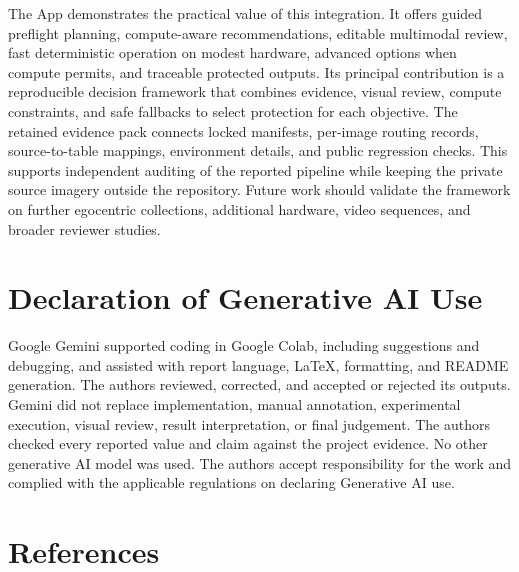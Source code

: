 \documentclass[10pt,twocolumn]{IEEEtran}
\begin{document}
\begin{strip}
\begin{minipage}[t]{0.485\textwidth}
The App demonstrates the practical value of this integration. It offers guided
preflight planning, compute-aware recommendations, editable multimodal review,
fast deterministic operation on modest hardware, advanced options when compute
permits, and traceable protected outputs. Its principal contribution is a
reproducible decision framework that combines evidence, visual review, compute
constraints, and safe fallbacks to select protection for each objective.
The retained evidence pack connects locked manifests, per-image routing records,
source-to-table mappings, environment details, and public regression checks.
This supports independent auditing of the reported pipeline while keeping the
private source imagery outside the repository.
Future work should validate the framework on further egocentric collections,
additional hardware, video sequences, and broader reviewer studies.

\section*{Declaration of Generative AI Use}

Google Gemini supported coding in Google Colab, including suggestions and
debugging, and assisted with report language, LaTeX, formatting, and README
generation. The authors reviewed, corrected, and accepted or rejected its
outputs. Gemini did not replace implementation, manual annotation, experimental
execution, visual review, result interpretation, or final judgement. The
authors checked every reported value and claim against the project evidence.
No other generative AI model was used. The authors accept responsibility for
the work and complied with the applicable regulations on declaring Generative
AI use.
\end{minipage}
\hfill
\begin{minipage}[t]{0.485\textwidth}
\section*{References}
\renewcommand*{\bibfont}{\fontsize{6.5}{8.15}\selectfont}
\setlength{\bibitemsep}{1.0pt}
\setlength{\biblabelsep}{2.5pt}
\printbibliography[heading=none]
\end{minipage}
\end{strip}
\mbox{}
\end{document}
